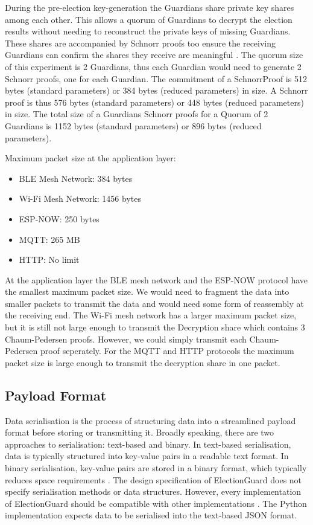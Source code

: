 During the pre-election key-generation the Guardians share private key shares among each other. This allows a quorum of Guardians to decrypt the election results without needing to reconstruct the private keys of missing Guardians. These shares are accompanied by Schnorr proofs too ensure the receiving Guardians can confirm the shares they receive are meaningful \cite[9]{eg-spec}. The quorum size of this experiment is 2 Guardians, thus each Guardian would need to generate 2 Schnorr proofs, one for each Guardian. The commitment of a SchnorrProof is 512 bytes (standard parameters) or 384 bytes (reduced parameters) in size. A Schnorr proof is thus 576 bytes (standard parameters) or 448 bytes (reduced parameters) in size. The total size of a Guardians Schnorr proofs for a Quorum of 2 Guardians is 1152 bytes (standard parameters) or 896 bytes (reduced parameters). 

Maximum packet size at the application layer:
\begin{itemize}
    \item \ac{BLE} Mesh Network: 384 bytes \cite[35]{esp-faq}
    \item Wi-Fi Mesh Network: 1456 bytes \cite[54]{esp-faq}
    \item ESP-NOW: 250 bytes \cite[47]{esp-faq}
    \item \ac{MQTT}: 265 MB \cite[16]{protocols}
    \item HTTP: No limit \cite[16]{protocols}
\end{itemize}

At the application layer the \ac{BLE} mesh network and the ESP-NOW protocol have the smallest maximum packet size. We would need to fragment the data into smaller packets to transmit the data and would need some form of reassembly at the receiving end. The Wi-Fi mesh network has a larger maximum packet size, but it is still not large enough to transmit the Decryption share which contains 3 Chaum-Pedersen proofs. However, we could simply transmit each Chaum-Pedersen proof seperately. For the \ac{MQTT} and HTTP protocols the maximum packet size is large enough to transmit the decryption share in one packet.

\subsection{Payload Format}
Data serialisation is the process of structuring data into a streamlined payload format before storing or transmitting it. Broadly speaking, there are two approaches to serialisation: text-based and binary. In text-based serialisation, data is typically structured into key-value pairs in a readable text format. In binary serialisation, key-value pairs are stored in a binary format, which typically reduces space requirements \cite[11]{serialisation}. The design specification of ElectionGuard does not specify serialisation methods or data structures. However, every implementation of ElectionGuard should be compatible with other implementations \cite[23]{eg-paper}. The Python implementation expects data to be serialised into the text-based JSON format.

